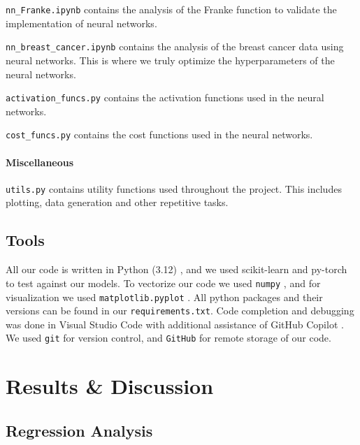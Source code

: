 \documentclass[aps,pra,english,notitlepage,reprint,nofootinbib]{revtex4-1}  %
\begin{document}
\verb|nn_Franke.ipynb| contains the analysis of the Franke function to validate the implementation of neural networks.

\verb|nn_breast_cancer.ipynb| contains the analysis of the breast cancer data using neural networks. This is where we truly optimize the hyperparameters of the neural networks.

\verb|activation_funcs.py| contains the activation functions used in the neural networks.

\verb|cost_funcs.py| contains the cost functions used in the neural networks.

\paragraph*{Miscellaneous}
\verb|utils.py| contains utility functions used throughout the project. This includes plotting, data generation and other repetitive tasks.

\subsection{Tools}\label{subsec:tools}

All our code is written in Python (3.12) \cite{Python},  and we used scikit-learn \cite{scikit-learn} and py-torch to test against our models. To vectorize our code we used \verb|numpy| \cite{Numpy}, and for visualization we used \verb|matplotlib.pyplot| \cite{Matplotlib}. All python packages and their versions can be found in our \verb|requirements.txt|. Code completion and debugging was done in Visual Studio Code \cite{VSCode} with additional assistance of GitHub Copilot \cite{Copilot}. We used \verb|git| \cite{Git} for version control, and \verb|GitHub| \cite{GitHub} for remote storage of our code.

\section{Results \& Discussion}\label{sec:results discussion}
\subsection{Regression Analysis}
\end{document}
